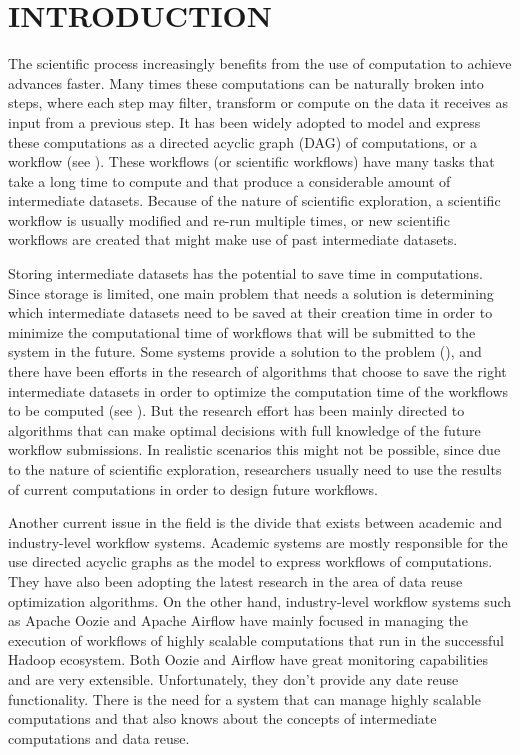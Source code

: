 \chapter{INTRODUCTION}
\label{chap:introduction}
The scientific process increasingly benefits from the use of computation to achieve advances faster. Many times these computations can be naturally broken into steps, where each step may filter, transform or compute on the data it receives as input from a previous step.  It has been widely adopted to model and express these computations as a directed acyclic graph (DAG) of computations, or a workflow (see \cite{liu2015survey}).  These workflows (or scientific workflows) have many tasks that take a long time to compute and that produce a considerable amount of intermediate datasets.  Because of the nature of scientific exploration, a scientific workflow is usually modified and re-run multiple times, or new scientific workflows are created that might make use of past intermediate datasets.  

Storing intermediate datasets has the potential to save time in computations. Since storage is limited, one main problem that needs a solution is determining which intermediate datasets need to be saved at their creation time in order to minimize the computational time of workflows that will be submitted to the system in the future. Some systems provide a solution to the problem (\cite{yuan2012data}), and there have been efforts in the research of algorithms that choose to save the right intermediate datasets in order to optimize the computation time of the workflows to be computed (see \cite{bazzi}). But the research effort has been mainly directed to algorithms that can make optimal decisions with full knowledge of the future workflow submissions.  In realistic scenarios this might not be possible, since due to the nature of scientific exploration, researchers usually need to use the results of current computations in order to design future workflows.

Another current issue in the field is the divide that exists between academic and industry-level workflow systems.  Academic systems are mostly responsible for the use directed acyclic graphs as the model to express workflows of computations.  They have also been adopting the latest research in the area of data reuse optimization algorithms.  On the other hand, industry-level workflow systems such as Apache Oozie and Apache Airflow have mainly focused in managing the execution of workflows of highly scalable computations that run in the successful Hadoop ecosystem. Both Oozie and Airflow have great monitoring capabilities and are very extensible. Unfortunately, they don't provide any date reuse functionality.  There is the need for a system that can manage highly scalable computations and that also knows about the concepts of intermediate computations and data reuse.

